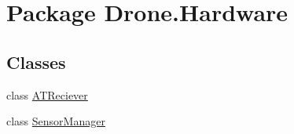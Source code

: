 \hypertarget{namespace_drone_1_1_hardware}{}\section{Package Drone.\+Hardware}
\label{namespace_drone_1_1_hardware}
\subsection*{Classes}
\begin{DoxyCompactItemize}
\item 
class \hyperlink{class_drone_1_1_hardware_1_1_a_t_reciever}{A\+T\+Reciever}
\item 
class \hyperlink{class_drone_1_1_hardware_1_1_sensor_manager}{Sensor\+Manager}
\end{DoxyCompactItemize}
